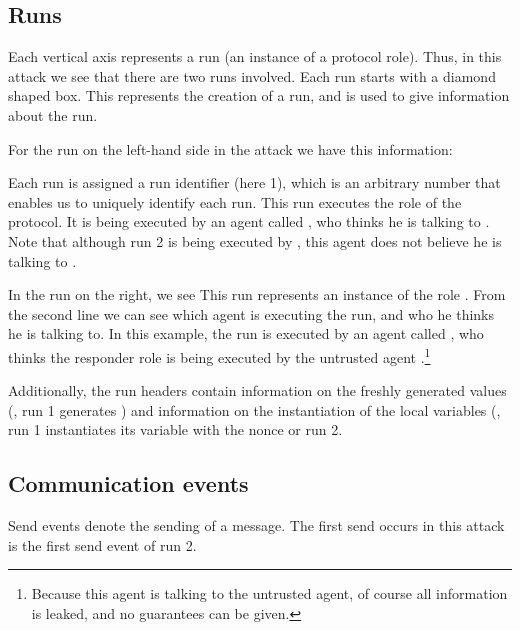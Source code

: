 \documentclass{book}
\begin{document}
\subsection{Runs}

Each vertical axis represents a run (an instance of a protocol role).
Thus, in this attack we see that there are two runs involved. Each run
starts with a diamond shaped box. This represents the creation of a run,
and is used to give information about the run.

For the run on the left-hand side in the attack we have this information:


Each run is assigned a run identifier (here 1), which is an arbitrary
number that enables us to uniquely identify each run. This run executes
the  role of the protocol. It is being executed by an agent
called , who thinks he is talking to . Note that
although run 2 is being executed by , this agent does not
believe he is talking to .


In the run on the right, we see
This run
represents an instance of the role .  From the second line we can
see which agent is executing the run, and who he thinks he is talking
to. In this example, the run is executed by an agent called
, who thinks the responder role is being executed by the
untrusted agent .\footnote{Because this agent is talking to the
untrusted agent, of course all information is leaked, and no guarantees
can be given.}

Additionally, the run headers contain information on the freshly
generated values 
(\eg, run 1 generates ) and information on the
instantiation of the local variables (\eg, run 1 instantiates its
variable  with the nonce  or run 2.


\subsection{Communication events}

Send events denote the sending of a message. The first send 
occurs in this attack is the first send event of run 2.
\end{document}

